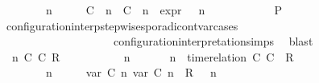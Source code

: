 \begin{isabellebody}
\ \ \ \ \ \ \ {\isacartoucheopen}{\isacharparenleft}{\isasymGamma}\ n\ {\isasymturnstile}\ {\isasymPsi}\ {\isasymtriangleright}\ {\isasymPhi}\ {\isacharequal}\ {\isacharparenleft}{\isacharparenleft}{\isacharparenleft}C\ {\isasymUp}\ n{\isacharparenright}\ {\isacharhash}\ {\isacharparenleft}C\ {\isasymDown}\ n\ {\isacharat}{\isasymsharp}\ {\isasymtau}\isactrlsub e\isactrlsub x\isactrlsub p\isactrlsub r{\isacharparenright}\ {\isacharhash}\ {\isasymGamma}{\isacharparenright}{\isacharcomma}\ n\ {\isasymturnstile}\ {\isasymPsi}\ {\isasymtriangleright}\ {\isasymPhi}{\isacharparenright}{\isacartoucheclose}\isanewline
\ \ \ \ \ \ \isamarkupfalse%
\ {\isacharquery}P\ \isamarkupfalse%
\ configuration{\isacharunderscore}interp{\isacharunderscore}stepwise{\isacharunderscore}sporadicon{\isacharunderscore}tvar{\isacharunderscore}cases\isanewline
\ \ \ \ \ \ \ \ \ \ \ \ \ \ \ \ \ \ \ \ configuration{\isacharunderscore}interpretation{\isachardot}simps\ \isamarkupfalse%
\ blast\isanewline
\ \ \ \ \isamarkupfalse%
\isanewline
\ \ \ \ \ \ \isamarkupfalse%
\ {\isasymGamma}\ n\ C\ C\ R\ {\isasymPsi}\ {\isasymPhi}\isanewline
\ \ \ \ \ \ \isamarkupfalse%
\ {\isacartoucheopen}{\isacharparenleft}{\isasymGamma}\ n\ {\isasymturnstile}\ {\isasymPsi}\ {\isasymtriangleright}\ {\isasymPhi}\ {\isacharequal}\ {\isacharparenleft}{\isasymGamma}{\isacharcomma}\ n\ {\isasymturnstile}\ {\isacharparenleft}time{\isacharminus}relation\ {\isasymlfloor}C\ C\ {\isasymin}\ R{\isacharparenright}\ {\isacharhash}\ {\isasymPsi}\ {\isasymtriangleright}\ {\isasymPhi}{\isacharparenright}{\isacartoucheclose}\isanewline
\ \ \ \ \ \ \ {\isacartoucheopen}{\isacharparenleft}{\isasymGamma}\ n\ {\isasymturnstile}\ {\isasymPsi}\ {\isasymtriangleright}\ {\isasymPhi}\ {\isacharequal}\ {\isacharparenleft}{\isacharparenleft}{\isacharparenleft}{\isasymlfloor}{\isasymtau}\isactrlsub v\isactrlsub a\isactrlsub r\ {\isacharparenleft}C\ n{\isacharparenright}{\isacharcomma}\ {\isasymtau}\isactrlsub v\isactrlsub a\isactrlsub r\ {\isacharparenleft}C\ n{\isacharparenright}{\isasymrfloor}\ {\isasymin}\ R{\isacharparenright}\ {\isacharhash}\ {\isasymGamma}{\isacharparenright}{\isacharcomma}\ n\isanewline

\end{isabellebody}

